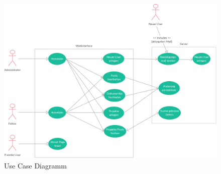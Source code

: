 \begin{figure}[H]
	\begin{center}
		\includegraphics[width=\linewidth]{images/use_case.png}
		\caption{Use Case Diagramm}
	\end{center}
\end{figure}
